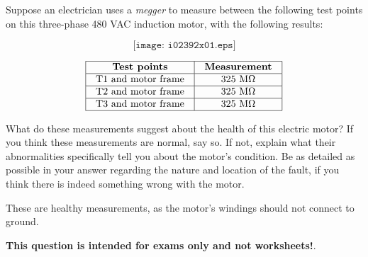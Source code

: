 

Suppose an electrician uses a {\it megger} to measure between the following test points on this three-phase 480 VAC induction motor, with the following results:

$$\texttt{[image: i02392x01.eps]}$$


$$\vbox{\offinterlineskip
\halign{\strut
\vrule \quad\hfil # \ \hfil & 
\vrule \quad\hfil # \ \hfil \vrule \cr
\noalign{\hrule}
%
{\bf Test points} & {\bf Measurement} \cr
%
\noalign{\hrule}
%
T1 and motor frame & 325 M$\Omega$ \cr
%
\noalign{\hrule}
%
T2 and motor frame & 325 M$\Omega$ \cr
%
\noalign{\hrule}
%
T3 and motor frame & 325 M$\Omega$ \cr
%
\noalign{\hrule}
} %
}$$ %

What do these measurements suggest about the health of this electric motor?  If you think these measurements are normal, say so.  If not, explain what their abnormalities specifically tell you about the motor's condition.  Be as detailed as possible in your answer regarding the nature and location of the fault, if you think there is indeed something wrong with the motor.







These are healthy measurements, as the motor's windings should not connect to ground.







{\bf This question is intended for exams only and not worksheets!}.


